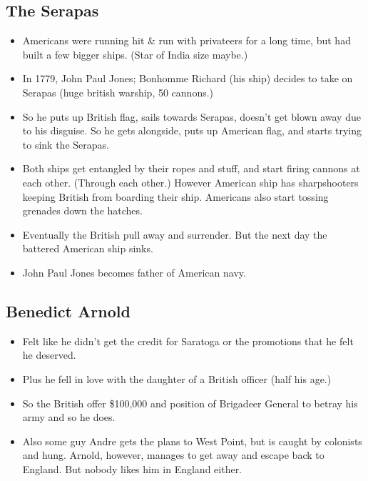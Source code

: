 \documentclass{article}
\begin{document}
    \subsection{The Serapas}
      \begin{itemize}
        \item Americans were running hit \& run with privateers for a long time, but had built a few bigger ships. (Star of India size maybe.)
        \item In 1779, John Paul Jones; Bonhomme Richard (his ship) decides to take on Serapas (huge british warship, 50 cannons.)
        \item So he puts up British flag, sails towards Serapas, doesn't get blown away due to his disguise. So he gets alongside, puts up American flag, and starts trying to sink the Serapas.
        \item Both ships get entangled by their ropes and stuff, and start firing cannons at each other. (Through each other.) However American ship has sharpshooters keeping British from boarding their ship. Americans also start tossing grenades down the hatches.
        \item Eventually the British pull away and surrender.  But the next day the battered American ship sinks.
        \item John Paul Jones becomes father of American navy.
      \end{itemize}
    \subsection{Benedict Arnold}
      \begin{itemize}
        \item Felt like he didn't get the credit for Saratoga or the promotions that he felt he deserved.
        \item Plus he fell in love with the daughter of a British officer (half his age.)
        \item So the British offer \$100,000 and position of Brigadeer General to betray his army and so he does.
        \item Also some guy Andre gets the plans to West Point, but is caught by colonists and hung. Arnold, however, manages to get away and escape back to England. But nobody likes him in England either. 
      \end{itemize}
\end{document}
